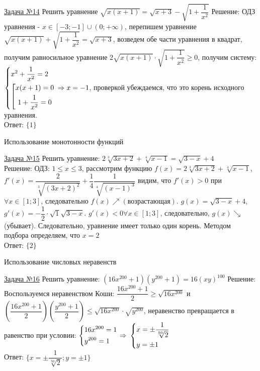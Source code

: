 \documentclass[a4paper,12pt]{article} %
\begin{document}
\label{Problem14}
\underline{Задача №14} 
Решить уравнение $\sqrt{x(x+1)}=\sqrt{x+3}-\sqrt{1+\dfrac{1}{x^2}}$\newline
Решение: ОДЗ уравнения - $x \in [-3;-1] \cup (0;+\infty)$, перепишем уравнение
$\sqrt{x(x+1)}+\sqrt{1+\dfrac{1}{x^2}}=\sqrt{x+3}$, возведем обе части уравнения
в квадрат, получим равносильное уравнение $2\sqrt{x(x+1)}\cdot\sqrt{1+\dfrac{1}{x^2}} \ge 0$,
получим систему: 
$\begin{dcases}
	x^2+\dfrac{1}{x^2}=2 \\
	\left[\begin{gathered}
		x(x+1)=0 \hfill \\
		1+\dfrac{1}{x^2}=0
	\end{gathered}\right.
\end{dcases} \Rightarrow x=-1$, проверкой убеждаемся, что это корень исходного уравнения.\\
Ответ: $\{ 1 \}$

\begin{center}
{\large Использование монотонности функций}
\end{center}

\label{Problem15}
\underline{Задача №15} 
Решить уравнение: $2\sqrt[3]{3x+2}+\sqrt[4]{x-1}=\sqrt{3-x}+4$\\
Решение: ОДЗ: $1\le x \le 3$, рассмотрим функцию $f(x)=2\sqrt[3]{3x+2}+\sqrt[4]{x-1}$,\\
$f'(x)=\dfrac{2}{\sqrt[3]{(3x+2)^2}}+\dfrac14\dfrac{1}{\sqrt[4]{(x-1)^3}}$
видим, что $f'(x)>0$ при $\forall x \in [1;3]$, следовательно $f(x) \nearrow(возрастающая)$.
$g(x)=\sqrt{3-x}+4$, $g'(x)=-\dfrac12\cdot \sqrt{1}{\sqrt{3-x}}$. 
$g'(x)<0 \forall x \in [1;3]$, следовательно, $g(x)\searrow$ (убывает).
Следовательно, уравнение имеет только один корень. Методом подбора определяем, что 
$x=2$\\
Ответ: $\{ 2 \}$

\begin{center}
{\large Использование числовых неравенств}
\end{center}

\label{Problem16}
\underline{Задача №16}
Решить уравнение: $(16x^{200}+1)(y^{200}+1)=16(xy)^{100}$\newline
Решение: Воспользуемся неравенством Коши: $\dfrac{16x^{200}+1}{2} \ge \sqrt{16x^{200}}$
и \\$\left( \dfrac{16x^{200}+1}{2} \right) \left( \dfrac{y^{200}+1}{2} \right) \le \sqrt{16x^{200}} \cdot \sqrt{y^{200}}$,
неравенство превращается в равенство при условии: 
$\begin{dcases}
	16x^{200}=1\\
	y^{200}=1
\end{dcases}\Rightarrow$
$\begin{dcases}
	x=\pm \dfrac{1}{\sqrt[50]{2}} \\
	y=\pm1
\end{dcases}$\\
Ответ: $\{ x=\pm\dfrac{1}{\sqrt[50]{2}}; y=\pm1 \}$
\end{document}
